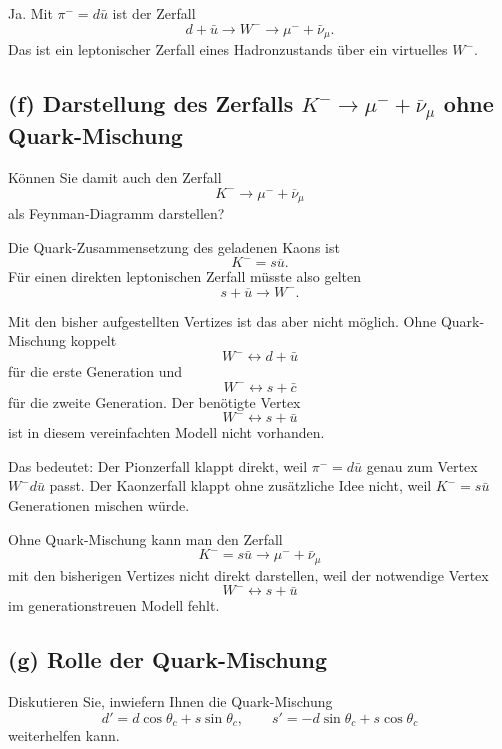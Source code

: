 \documentclass[11pt,a4paper]{scrartcl}
\begin{document}
\begin{answerbox}
Ja. Mit $\pi^-=d\bar u$ ist der Zerfall
\[
\boxed{d+\bar u\to W^-\to \mu^-+\bar\nu_\mu}.
\]
Das ist ein leptonischer Zerfall eines Hadronzustands über ein virtuelles $W^-$.
\end{answerbox}

\subsection*{(f) Darstellung des Zerfalls $K^-\to\mu^-+\overline\nu_\mu$ ohne Quark-Mischung}

Können Sie damit auch den Zerfall
\[
K^-\to\mu^-+\overline\nu_\mu
\]
als Feynman-Diagramm darstellen?

\begin{calculationbox}
Die Quark-Zusammensetzung des geladenen Kaons ist
\[
K^- = s\overline u.
\]
Für einen direkten leptonischen Zerfall müsste also gelten
\[
s+\overline u \to W^-.
\]

\begin{calculationbox}
Mit den bisher aufgestellten Vertizes ist das aber nicht möglich. Ohne Quark-Mischung koppelt
\[
W^- \leftrightarrow d+\bar u
\]
für die erste Generation und
\[
W^- \leftrightarrow s+\bar c
\]
für die zweite Generation.
Der benötigte Vertex
\[
W^- \leftrightarrow s+\bar u
\]
ist in diesem vereinfachten Modell nicht vorhanden.
\end{calculationbox}

Das bedeutet: Der Pionzerfall klappt direkt, weil $\pi^-=d\bar u$ genau zum Vertex $W^-d\bar u$ passt. Der Kaonzerfall klappt ohne zusätzliche Idee nicht, weil $K^-=s\bar u$ Generationen mischen würde.
\end{calculationbox}

\begin{answerbox}
Ohne Quark-Mischung kann man den Zerfall
\[
K^-=s\bar u\to \mu^-+\bar\nu_\mu
\]
mit den bisherigen Vertizes nicht direkt darstellen, weil der notwendige Vertex
\[
\boxed{W^-\leftrightarrow s+\bar u}
\]
im generationstreuen Modell fehlt.
\end{answerbox}

\subsection*{(g) Rolle der Quark-Mischung}

Diskutieren Sie, inwiefern Ihnen die Quark-Mischung
\[
d' = d\cos\theta_c+s\sin\theta_c,
\qquad
s'=-d\sin\theta_c+s\cos\theta_c
\]
weiterhelfen kann.
\end{document}
